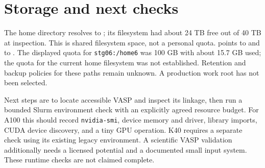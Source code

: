 \documentclass[10pt,a4paper]{article}
\begin{document}
\section{Storage and next checks}
The home directory resolves to ; its filesystem had
about 24 TB free out of 40 TB at inspection. This is shared filesystem space,
not a personal quota.  points to  and
 to . The displayed quota for
\texttt{stg06:/home6} was 100 GB with about 15.7 GB used; the quota for the
current home filesystem was not established. Retention and backup policies
for these paths remain unknown. A production work root has not been selected.

Next steps are to locate accessible VASP and inspect its linkage, then run a
bounded Slurm environment check with an explicitly agreed resource budget.
For A100 this should record \texttt{nvidia-smi}, device memory and driver,
library imports, CUDA device discovery, and a tiny GPU operation.
K40 requires a separate check using its existing legacy environment.
A scientific VASP validation additionally needs a licensed potential and
a documented small input system. These runtime checks are not claimed complete.
\end{document}
